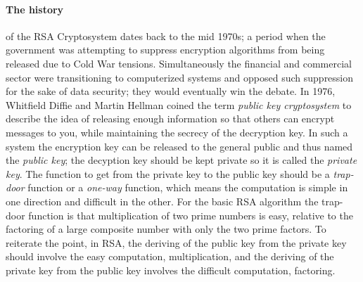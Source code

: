 \documentclass[12pt]{article}
\theoremstyle{remark}
\begin{document}
\paragraph{The history} of the RSA Cryptosystem dates back to the mid 1970s; a period when the government was attempting to suppress encryption algorithms  from being released due to Cold War tensions.  Simultaneously the financial and commercial sector were transitioning to computerized systems and opposed such suppression for the sake of data security; they would eventually win the debate.  In 1976, Whitfield Diffie and Martin Hellman coined the term \textit{public key cryptosystem} to describe the idea of releasing enough information so that others can encrypt messages to you, while maintaining the secrecy of the decryption key.  In such a system the encryption key can be released to the general public and thus named the \textit{public key}; the decyption key should be kept private so it is called the \textit{private key}.  The function to get from the private key to the public key should be a \textit{trap-door} function or a \textit{one-way} function, which means the computation is simple in one direction and difficult in the other.  For the basic RSA algorithm the trap-door function is that multiplication of two prime numbers is easy, relative to the factoring of a large composite number with only the two prime factors.  To reiterate the point, in RSA, the deriving of the public key from the private key should involve the easy computation, multiplication, and the deriving of the private key from the public key involves the difficult computation, factoring.
\end{document}
